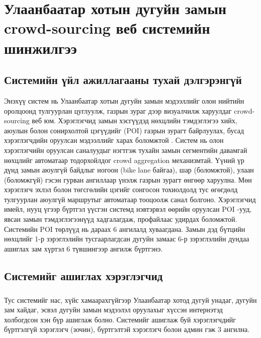 \chapter{Улаанбаатар хотын дугуйн замын crowd-sourcing веб системийн шинжилгээ} %
\label{Chapter2} %

\section{Системийн үйл ажиллагааны тухай дэлгэрэнгүй}
Энэхүү систем нь Улаанбаатар хотын дугуйн замын мэдээллийг олон нийтийн оролцоонд тулгуурлан цуглуулж, газрын зураг дээр визуалчилж харуулдаг crowd-sourcing веб юм. Хэрэглэгчид замын хэсгүүдэд нөхцлийн тэмдэглэгээ хийх, аюулын болон сонирхолтой цэгүүдийг (POI) газрын зурагт байрлуулах, бусад хэрэглэгчдийн оруулсан мэдээллийг харах боломжтой \cite{Reference3}. Систем нь олон хэрэглэгчийн оруулсан саналуудыг нэгтгэж тухайн замын сегментийн давамгай нөхцлийг автоматаар тодорхойлдог crowd aggregation механизмтай. Үүний үр дүнд замын аюулгүй байдлыг ногоон (bike lane байгаа), шар (боломжтой), улаан (боломжгүй) гэсэн гурван ангиллаар үнэлж газрын зурагт өнгөөр харуулна. Мөн хэрэглэгч эхлэл болон төгсгөлийн цэгийг сонгосон тохиолдолд тус өгөгдөлд тулгуурлан аюулгүй маршрутыг автоматаар тооцоолж санал болгоно. Хэрэглэгчид имейл, нууц үгээр бүртгэл үүсгэн системд нэвтэрвэл өөрийн оруулсан POI -ууд, явсан замын тэмдэглэгээнүүд хадгалагдаж, профайлаас удирдах боломжтой. Системийн POI төрлүүд нь дараах 6 ангилалд хуваагдана.  Замын дэд бүтцийн нөхцлийг 1-р зэрэглэлийн тусгаарлагдсан дугуйн замаас 6-р зэрэглэлийн дундаа ашиглах зам хүртэл 6 түвшингээр ангилж бүртгэнэ.

\section{Системийг ашиглах хэрэглэгчид}
\paragraph{} Тус системийг нас, хүйс хамаарахгүйгээр Улаанбаатар хотод дугуй унадаг, дугуйн зам хайдаг, эсвэл дугуйн замын мэдээлэл оруулахыг хүссэн интернэтэд холбогдсон хэн бүр ашиглаж болно. Системийг ашиглаж буй хэрэглэгчдийг бүртгэлгүй хэрэглэгч (зочин), бүртгэлтэй хэрэглэгч болон админ гэж 3 ангилна.

